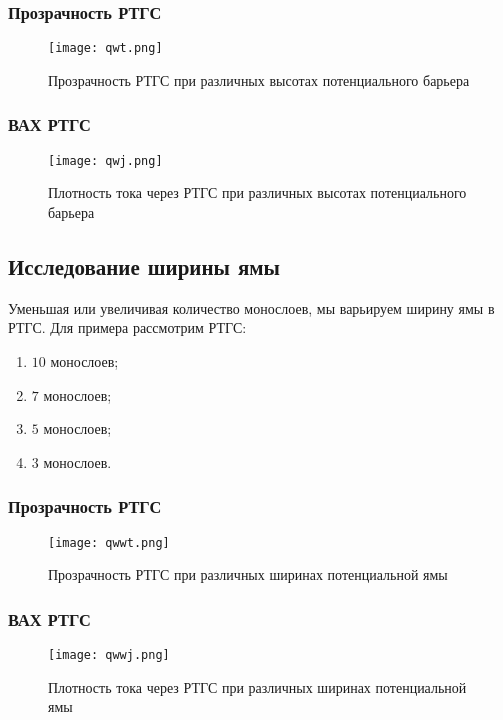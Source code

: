 \subsubsection{Прозрачность РТГС}
\begin{figure}[h]
	\centering
	\texttt{[image: qwt.png]}
	\caption{Прозрачность РТГС при различных высотах потенциального барьера}
	\label{fig:qwt}
\end{figure}

\subsubsection{ВАХ РТГС}
\begin{figure}[h]
	\centering
	\texttt{[image: qwj.png]}
	\caption{Плотность тока через РТГС при различных высотах потенциального барьера}
	\label{fig:qwj}
\end{figure}

\subsection{Исследование ширины ямы}
Уменьшая или увеличивая количество монослоев, мы варьируем ширину ямы в РТГС. Для примера рассмотрим РТГС:
\begin{enumerate}
	\item $10$ монослоев;
	\item $7$ монослоев;
	\item $5$ монослоев;
	\item $3$ монослоев.
\end{enumerate}
\subsubsection{Прозрачность РТГС}
\begin{figure}[h]
	\centering
	\texttt{[image: qwwt.png]}
	\caption{Прозрачность РТГС при различных ширинах потенциальной ямы}
	\label{fig:qwwt}
\end{figure}
\subsubsection{ВАХ РТГС}
\begin{figure}[h]
	\centering
	\texttt{[image: qwwj.png]}
	\caption{Плотность тока через РТГС при различных ширинах потенциальной ямы}
	\label{fig:qwwj}
\end{figure}